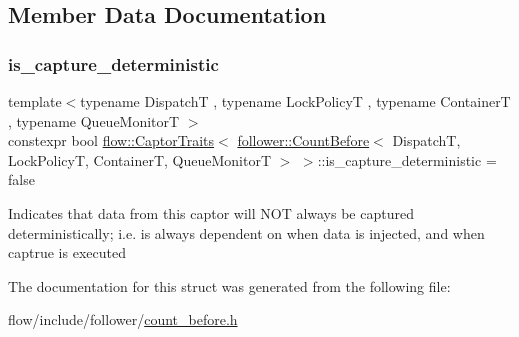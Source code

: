 \subsection{Member Data Documentation}
\mbox{\label{structflow_1_1_captor_traits_3_01follower_1_1_count_before_3_01_dispatch_t_00_01_lock_policy_t_0d08c28482191f4a9fdac77c50d53921d_a1e7e3deda342f19b5c2df4c3a66f7af8}} 
\subsubsection{\texorpdfstring{is\+\_\+capture\+\_\+deterministic}{is\_capture\_deterministic}}
{\footnotesize\ttfamily template$<$typename DispatchT , typename Lock\+PolicyT , typename ContainerT , typename Queue\+MonitorT $>$ \\
constexpr bool \hyperlink{structflow_1_1_captor_traits}{flow\+::\+Captor\+Traits}$<$ \hyperlink{classflow_1_1follower_1_1_count_before}{follower\+::\+Count\+Before}$<$ DispatchT, Lock\+PolicyT, ContainerT, Queue\+MonitorT $>$ $>$\+::is\+\_\+capture\+\_\+deterministic = false\hspace{0.3cm}{\ttfamily [static]}}

Indicates that data from this captor will N\+OT always be captured deterministically; i.\+e. is always dependent on when data is injected, and when captrue is executed 

The documentation for this struct was generated from the following file\+:\begin{DoxyCompactItemize}
\item 
flow/include/follower/\hyperlink{count__before_8h}{count\+\_\+before.\+h}\end{DoxyCompactItemize}
